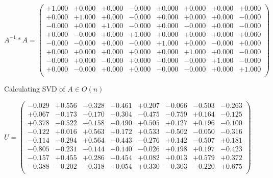 \documentclass[9pt]{article}
\theoremstyle{plain}
\theoremstyle{definition}
\theoremstyle{remark}
\numberwithin{equation}{section}
\begin{document}
$A^{-1} *A = \left(
\begin{array}{
cccccccc}
+1.000 & +0.000 & +0.000 & -0.000 & +0.000 & +0.000 & +0.000 & +0.000 \\
+0.000 & +1.000 & +0.000 & -0.000 & +0.000 & +0.000 & +0.000 & -0.000 \\
-0.000 & +0.000 & +1.000 & -0.000 & +0.000 & -0.000 & +0.000 & -0.000 \\
+0.000 & -0.000 & +0.000 & +1.000 & +0.000 & +0.000 & +0.000 & +0.000 \\
-0.000 & -0.000 & +0.000 & -0.000 & +1.000 & +0.000 & -0.000 & +0.000 \\
+0.000 & +0.000 & +0.000 & +0.000 & +0.000 & +1.000 & +0.000 & -0.000 \\
-0.000 & +0.000 & -0.000 & +0.000 & -0.000 & -0.000 & +1.000 & -0.000 \\
+0.000 & -0.000 & +0.000 & +0.000 & -0.000 & -0.000 & +0.000 & +1.000 \\
\end{array}
\right)$ \newline 

Calculating SVD of  $A \in O(n)$

$U = \left(
\begin{array}{
cccccccc}
-0.029 & +0.556 & -0.328 & -0.461 & +0.207 & -0.066 & -0.503 & -0.263 \\
+0.067 & -0.173 & -0.170 & -0.304 & -0.475 & -0.759 & +0.164 & -0.125 \\
+0.378 & -0.522 & -0.158 & -0.490 & +0.505 & +0.127 & +0.196 & -0.100 \\
-0.122 & +0.016 & +0.563 & +0.172 & +0.533 & -0.502 & -0.050 & -0.316 \\
-0.114 & -0.294 & +0.564 & -0.443 & -0.276 & +0.142 & -0.507 & +0.181 \\
-0.805 & -0.231 & -0.144 & -0.140 & -0.026 & +0.198 & +0.197 & -0.423 \\
-0.157 & +0.455 & +0.286 & -0.454 & +0.082 & +0.013 & +0.579 & +0.372 \\
-0.388 & -0.202 & -0.318 & +0.054 & +0.330 & -0.303 & -0.220 & +0.675 \\
\end{array}
\right)$ \newline 
\end{document}
